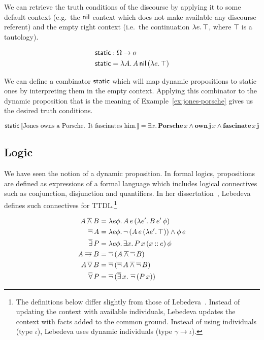 We can retrieve the truth conditions of the discourse by applying it to
some default context (e.g.\ the $\mathsf{nil}$ context which does not make
available any discourse referent) and the empty right context (i.e.\ the
continuation $\lambda e.\, \top$, where $\top$ is a tautology).

\begin{align*}
\mathsf{static} &: \Omega \to o \\
\mathsf{static} &= \lambda A.\, A\,\mathsf{nil}\,(\lambda e.\, \top)
\end{align*}

We can define a combinator $\mathsf{static}$ which will map dynamic propositions to
static ones by interpreting them in the empty context. Applying this
combinator to the dynamic proposition that is the meaning of
Example~\ref{ex:jones-porsche} gives us the desired truth conditions.

$$
\mathsf{static}\,\llbracket \text{Jones owns a Porsche. It fascinates him.} \rrbracket
= \exists x.\, \textbf{Porsche}\,x \land
  \textbf{own}\,\textbf{j}\,x \land \textbf{fascinate}\,x\,\textbf{j}
$$


\subsection{Logic}
\label{ssec:ttdl-logic}

We have seen the notion of a dynamic proposition. In formal logics,
propositions are defined as expressions of a formal language which includes
logical connectives such as conjunction, disjunction and quantifiers. In
her dissertation~\cite{lebedeva2012expression}, Lebedeva defines such
connectives for TTDL.\footnote{The definitions below differ slightly from
  those of Lebedeva~\cite{lebedeva2012expression}. Instead of updating the
  context with available individuals, Lebedeva updates the context with
  facts added to the common ground. Instead of using individuals (type
  $\iota$), Lebedeva uses dynamic individuals (type $\gamma \to \iota$).}

\begin{align*}
  A \mathbin{\overline{\land}} B &= \lambda e \phi.\, A\,e\,(\lambda e'.\, B\,e'\,\phi) \\
  \mathop{\overline{\lnot}} A &= \lambda e \phi.\, \lnot\,(A\,e\,(\lambda e'.\, \top)) \land \phi\,e \\
  \mathop{\overline{\exists}} P &= \lambda e \phi.\, \exists x.\, P\,x\,(x \mathbin{::} e)\,\phi \\
  A \mathbin{\overline{\to}} B &= \mathop{\overline{\lnot}}\,(A \mathbin{\overline{\land}} \mathop{\overline{\lnot}} B) \\
  A \mathop{\overline{\lor}} B &= \mathop{\overline{\lnot}}\,(\mathop{\overline{\lnot}} A \mathbin{\overline{\land}} \mathop{\overline{\lnot}} B) \\
  \mathop{\overline{\forall}} P &= \mathop{\overline{\lnot}}\,(\mathop{\overline{\exists}} x.\, \mathop{\overline{\lnot}}\,(P\,x))
\end{align*}

